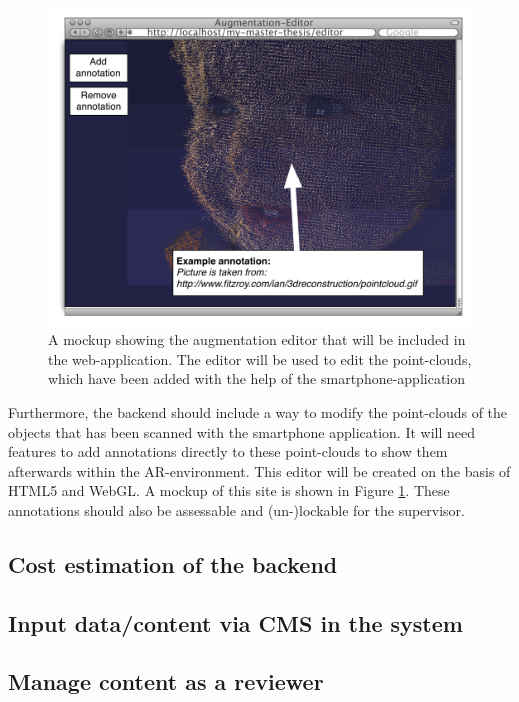 \begin{figure}[th]
\centerline{\includegraphics[width=1\textwidth]{gfx/mockup_web_1}}
\caption{A mockup showing the augmentation editor that will be included in the web-application. The editor will be used to edit the point-clouds, which have been added with the help of the smartphone-application}
\label{web1}
\end{figure}

Furthermore, the backend should include a way to modify the point-clouds of the objects that has been scanned with the smartphone application. It will need features to add annotations directly to these point-clouds to show them afterwards within the \ac{AR}-environment. This editor will be created on the basis of \ac{HTML5} and \ac{WebGL}. A mockup of this site is shown in Figure \ref{web1}. These annotations should also be assessable and (un-)lockable for the supervisor. 

\subsection{Cost estimation of the backend}

\subsection{Input data/content via CMS in the system}

\subsection{Manage content as a reviewer}

